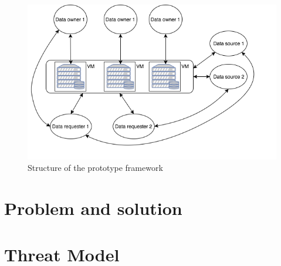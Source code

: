 \documentclass[conference]{IEEEtran}
\begin{document}
\begin{figure}[t]
	\includegraphics[width=0.95\linewidth]{mid_sem_graphic.png}
	\caption{Structure of the prototype framework}
	\label{fig:framework}
\end{figure}

\section{Problem and solution}


\section{Threat Model}

\end{document}
